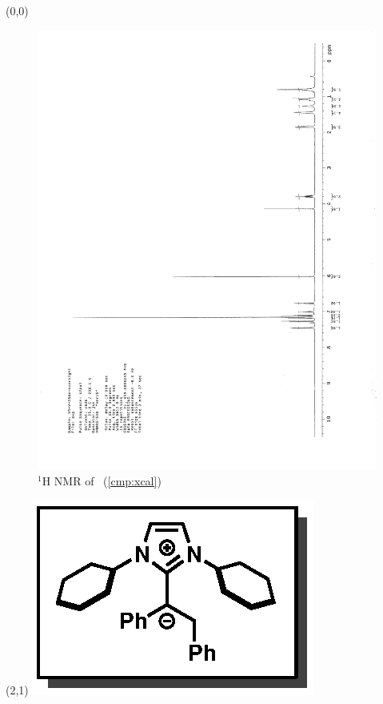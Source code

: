 \begin{textblock}{20}(0,0)
\begin{figure}[htb]
\caption{$^1$H NMR of \CMPxcal\ (\ref{cmp:xcal})}
\includegraphics[scale=0.75, trim = 0mm 0mm 0mm 5mm,
clip]{chp_alkylation/images/nmr/xcalH}
\vspace{-100pt}
\end{figure}
\end{textblock}
\begin{textblock}{1}(2,1)
\includegraphics[scale=0.8, angle=90]{chp_alkylation/images/xcal}
\end{textblock}
